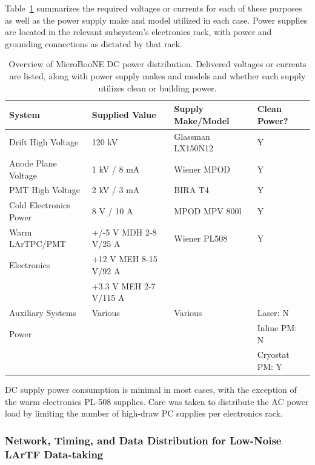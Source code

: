 Table~\ref{tab:DCPower} summarizes the required voltages or currents for each of these purposes as well as the power supply make and model utilized in each case.  Power supplies are located in the relevant subsystem's electronics rack, with power and grounding connections as dictated by that rack.

\begin{table}[!htb]
	\centering
	  \caption{Overview of MicroBooNE DC power distribution.  Delivered voltages or currents are listed, along with power supply makes and models and whether each supply utilizes clean or building power.}
    \begin{tabular}{llll}
     \hline
      System & Supplied Value & Supply Make/Model & Clean Power? \\ 
      \hline
      Drift High Voltage & 120 kV & Glassman LX150N12 & Y \\ 
      \hline
      Anode Plane Voltage & 1 kV / 8 mA & Wiener MPOD  & Y \\ 
      \hline
      PMT High Voltage & 2 kV / 3 mA & BIRA T4 & Y \\ 
      \hline
      Cold Electronics Power & 8 V / 10 A & MPOD MPV 800l & Y \\ 
      \hline
      Warm LArTPC/PMT& +/-5 V MDH 2-8 V/25 A& Wiener PL508 & Y\\
       Electronics & +12 V MEH 8-15 V/92 A & & \\ 
      & +3.3 V MEH 2-7 V/115 A & & \\ 
      \hline
       Auxiliary Systems & Various & Various & Laser: N \\
      Power &&& Inline PM: N \\
      &&& Cryostat PM: Y \\ 
      \hline
  \end{tabular}
  \label{tab:DCPower}
\end{table}

DC supply power consumption is minimal in most cases, with the exception of the warm \lartpc electronics PL-508 supplies.  Care was taken to distribute the AC power load by limiting the number of high-draw PC supplies per electronics rack.

\subsubsection{Network, Timing, and Data Distribution for Low-Noise LArTF Data-taking}


